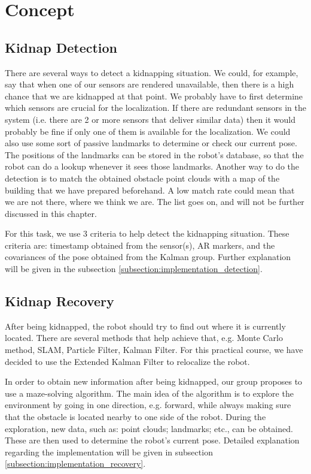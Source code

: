 \section{Concept} \label{section:concept}

\subsection{Kidnap Detection} \label{subsection:concept_detection}
There are several ways to detect a kidnapping situation. We could, for example, say that when one of our sensors are rendered unavailable, then there is a high chance that we are kidnapped at that point. We probably have to first determine which sensors are crucial for the localization. If there are redundant sensors in the system (i.e. there are 2 or more sensors that deliver similar data) then it would probably be fine if only one of them is available for the localization. We could also use some sort of passive landmarks to determine or check our current pose. The positions of the landmarks can be stored in the robot's database, so that the robot can do a lookup whenever it sees those landmarks. Another way to do the detection is to match the obtained obstacle point clouds with a map of the building that we have prepared beforehand. A low match rate could mean that we are not there, where we think we are. The list goes on, and will not be further discussed in this chapter.

For this task, we use 3 criteria to help detect the kidnapping situation. These criteria are: timestamp obtained from the sensor(s), AR markers, and the covariances of the pose obtained from the Kalman group. Further explanation will be given in the subsection \ref{subsection:implementation_detection}. 

\subsection{Kidnap Recovery} \label{subsection:concept_recovery}

After being kidnapped, the robot should try to find out where it is currently located. There are several methods that help achieve that, e.g. Monte Carlo method, SLAM, Particle Filter, Kalman Filter. For this practical course, we have decided to use the Extended Kalman Filter to relocalize the robot.

In order to obtain new information after being kidnapped, our group proposes to use a maze-solving algorithm. The main idea of the algorithm is to explore the environment by going in one direction, e.g. forward, while always making sure that the obstacle is located nearby to one side of the robot. During the exploration, new data, such as: point clouds; landmarks; etc., can be obtained. These are then used to determine the robot's current pose. Detailed explanation regarding the implementation will be given in subsection \ref{subsection:implementation_recovery}.

